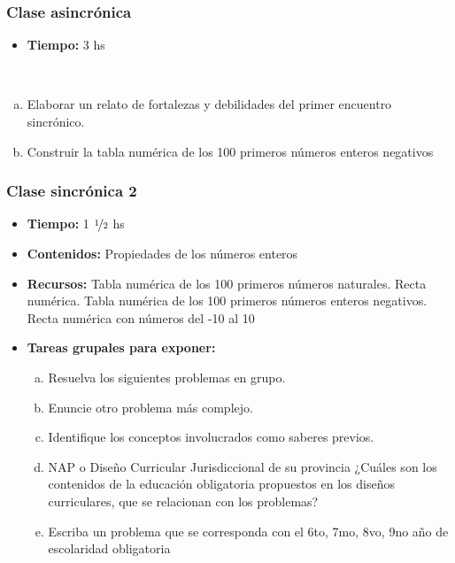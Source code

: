 \subsubsection{Clase asincrónica}

\begin{itemize}
	\item \textbf{Tiempo:} 3 hs
\end{itemize}

\begin{actividad}
	~
	\begin{enumerate}[a.]
		\item Elaborar un relato de fortalezas y debilidades del primer encuentro sincrónico.
		\item Construir la tabla numérica de los 100 primeros números enteros negativos
	\end{enumerate}
\end{actividad}

\subsubsection{Clase sincrónica 2}

\begin{itemize}
	\item \textbf{Tiempo:} 1 $\nicefrac12$ hs
	
	\item \textbf{Contenidos:} Propiedades de los números enteros
	
	\item \textbf{Recursos:} Tabla numérica de los 100 primeros números naturales. Recta numérica. Tabla numérica de los 100 primeros números enteros negativos. Recta numérica con números del -10 al 10
	
	\item \textbf{Tareas grupales para exponer:}
	\begin{enumerate}[a.]
		\item Resuelva los siguientes problemas en grupo.
		\item Enuncie otro problema más complejo.
		\item Identifique los conceptos involucrados como saberes previos.
		\item NAP o Diseño Curricular Jurisdiccional de su provincia ¿Cuáles son los contenidos de la educación obligatoria propuestos en los diseños curriculares, que se relacionan con los problemas?
		\item Escriba un problema que se corresponda con el 6to, 7mo, 8vo, 9no año de escolaridad obligatoria
	\end{enumerate}
\end{itemize}

